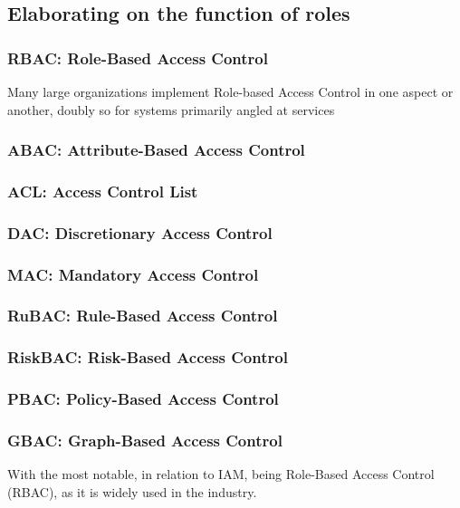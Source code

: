 \subsection{Elaborating on the function of roles}
\subsubsection{RBAC: Role-Based Access Control}
Many large organizations implement Role-based Access Control in one aspect or another\citep{RoleEngMethStd}, doubly so for systems primarily angled at services\citep{FormNormRBAC}
\subsubsection{ABAC: Attribute-Based Access Control}

\subsubsection{ACL: Access Control List}
\subsubsection{DAC: Discretionary Access Control}
\subsubsection{MAC: Mandatory Access Control}
\subsubsection{RuBAC: Rule-Based Access Control}
\subsubsection{RiskBAC: Risk-Based Access Control}
\subsubsection{PBAC: Policy-Based Access Control}
\subsubsection{GBAC: Graph-Based Access Control}

With the most notable, in relation to IAM, being Role-Based Access Control (RBAC), as it is widely used in the industry\citep{Gartner-DefIAM}.

